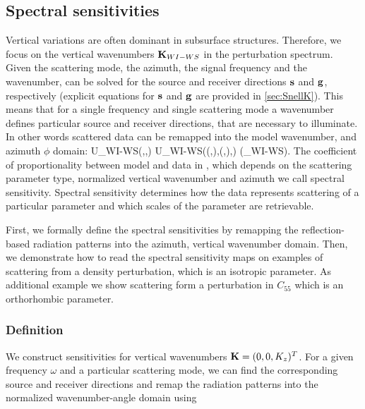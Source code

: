 \subsection{Spectral sensitivities}

Vertical variations are often dominant in subsurface structures. Therefore, we focus on the vertical wavenumbers $\mathbf{K}_{WI-WS}$ in the perturbation spectrum. Given the scattering mode, the azimuth, the signal frequency and the wavenumber,  can be solved for the source and receiver directions $\mathbf{s}$ and $\mathbf{g}$, respectively (explicit equations for $\mathbf{s}$ and $\mathbf{g}$ are provided in \cref{sec:SnellK}). This means that for a single frequency and single scattering mode a wavenumber defines particular source and receiver directions, that are necessary to illuminate. In other words scattered data can be remapped into the model wavenumber, and azimuth $\phi$ domain:
\beq \label{eq:DataK}
\delta U_{WI-WS}(\Kv,\phi,\omega) \equiv \delta U_{WI-WS}(\sv(\Kv,\phi),\gv(\Kv,\phi),\omega) \propto \delta \mv (\Kv_{WI-WS}).
\eeq
The coefficient of proportionality between model and data in , which depends on the scattering parameter type, normalized vertical wavenumber and azimuth we call spectral sensitivity. Spectral sensitivity determines how the data represents scattering of a particular parameter and which scales of the parameter are retrievable.

First, we formally define the spectral sensitivities by remapping the reflection-based radiation patterns into the azimuth, vertical wavenumber domain. Then, we demonstrate how to read the spectral sensitivity maps on examples of scattering from a density perturbation, which is an isotropic parameter. As additional example we show scattering form a perturbation in $C_{55}$ which is an orthorhombic parameter.

\subsubsection{Definition}
We construct sensitivities for vertical wavenumbers $\mathbf{K} = (0,0,K_z)^T$.
%
For a given frequency $\omega$ and a particular scattering mode, we can find the corresponding source and receiver directions and remap the radiation patterns into the normalized wavenumber-angle domain using 

